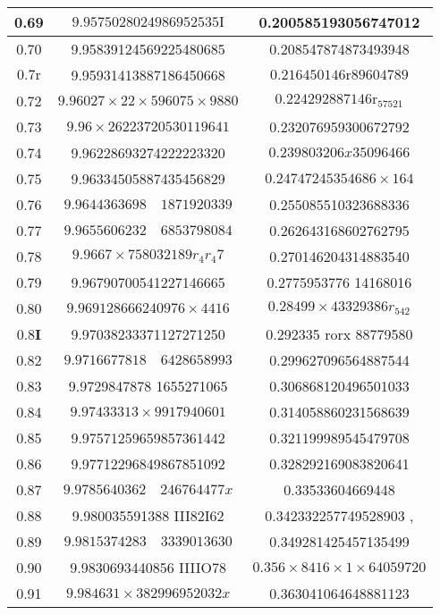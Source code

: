 \documentclass[10pt]{article}
\begin{document}
\begin{center}
\begin{tabular}{|c|c|c|}
\hline
0.69 & \(9.9575028024986952535 \mathrm{I}\) & 0.200585193056747012 \\
\hline
0.70 & 9.95839124569225480685 & 0.208547874873493948 \\
\hline
\(0.7 \mathrm{r}\) & 9.95931413887186450668 & \(0.216450146 \mathrm{r} 89604789\) \\
\hline
0.72 & \(9.96027 \times 22 \times 596075 \times 9880\) & \(0.224292887146 \mathrm{r}_{57521}\) \\
\hline
0.73 & \(9.96 \times 26223720530119641\) & 0.232076959300672792 \\
\hline
0.74 & 9.96228693274222223320 & \(0.239803206 x 35096466\) \\
\hline
0.75 & 9.96334505887435456829 & \(0.24747245354686 \times 164\) \\
\hline
0.76 & \(9.9644363698 \quad 1871920339\) & 0.255085510323688336 \\
\hline
0.77 & \(9.9655606232 \quad 6853798084\) & 0.262643168602762795 \\
\hline
0.78 & \(9.9667 \times 758032189 r_{4} r_{4} 7\) & 0.270146204314883540 \\
\hline
0.79 & 9.96790700541227146665 & 0.2775953776 14168016 \\
\hline
0.80 & \(9.969128666240976 \times 4416\) & \(0.28499 \times 43329386 r_{542}\) \\
\hline
\(0.8 \mathbf{I}\) & 9.97038233371127271250 & 0.292335 rorx 88779580 \\
\hline
0.82 & \(9.9716677818 \quad 6428658993\) & 0.299627096564887544 \\
\hline
0.83 & 9.9729847878 1655271065 & 0.306868120496501033 \\
\hline
0.84 & \(9.97433313 \times 9917940601\) & 0.314058860231568639 \\
\hline
0.85 & 9.97571259659857361442 & 0.321199989545479708 \\
\hline
0.86 & 9.97712296849867851092 & 0.328292169083820641 \\
\hline
0.87 & \(9.9785640362 \quad 246764477 x\) & 0.33533604669448 \\
\hline
0.88 & 9.980035591388 III82I62 & 0.342332257749528903 , \\
\hline
0.89 & \(9.9815374283 \quad 3339013630\) & 0.349281425457135499 \\
\hline
0.90 & 9.9830693440856 IIIIO78 & \(0.356 \times 8416 \times 1 \times 64059720\) \\
\hline
0.91 & \(9.984631 \times 382996952032 x\) & 0.363041064648881123 \\

\end{tabular}
\end{center}
\end{document}
